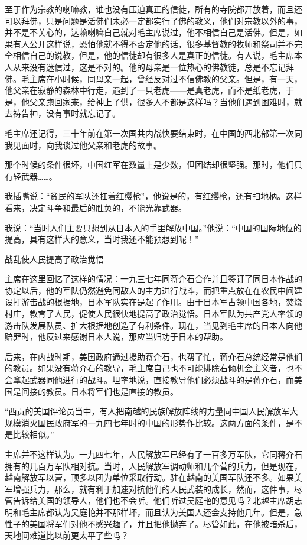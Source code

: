 至于作为宗教的喇嘛教，谁也没有压迫真正的信徒，所有的寺院都开放着，而且还可以拜佛，只是问题是活佛们未必一定都实行了佛的教义，他们对宗教以外的事，并不是不关心的，达赖喇嘛自己就对毛主席说过，他不相信自己是活佛。但是，如果有人公开这样说，恐怕他就不得不否定他的话，很多基督教的牧师和祭司并不完全相信自己的说教，但是，他的信徒却有很多人是真正的信徒。有人说，毛主席本人从来没有迷信过，这是不对的。他的母亲是一位热心的佛教徒，总是不忘记拜佛。毛主席在小时候，同母亲一起，曾经反对过不信佛教的父亲。但是，有一天，他父亲在寂静的森林中行走，遇到了一只老虎——是真老虎，而不是纸老虎，于是，他父亲跑回家来，给神上了供，很多人不都是这样吗？当他们遇到困难时，就去祷告神，没有事时就忘记了。

毛主席还记得，三十年前在第一次国共内战快要结束时，在中国的西北部第一次同我见面时，向我谈过他父亲和老虎的故事。

那个时候的条件很坏，中国红军在数量上是少数，但团结却很坚强。那时，他们只有轻武器……。

我插嘴说：“贫民的军队还扛着红缨枪”，他说是的，有红缨枪，还有扫地柄。这样看来，决定斗争和最后的胜负的，不能光靠武器。

我说：“当时人们主要只想到从日本人的手里解放中国。”他说：“中国的国际地位的提高，具有这样大的意义，当时我还不能预想到呢！”

战乱使人民提高了政治觉悟

主席在这里回忆了这样的情况：一九三七年同蒋介石合作并且签订了同日本作战的协定以后，他的军队仍然避免同敌人的主力进行战斗，而把重点放在在农民中间建设打游击战的根据地，日本军队实在是起了作用。由于日本军占领中国各地，焚烧村庄，教育了人民，促使人民很快地提高了政治觉悟。日本军队为共产党人率领的游击队发展队员、扩大根据地创造了有利条件。现在，当见到毛主席的日本人向他赔罪时，他反过来感谢日本人说，那应当归功于日本的帮助。

后来，在内战时期，美国政府通过援助蒋介石，也帮了忙，蒋介石总统经常是他们的教员。如果没有蒋介石的教导，毛主席自己也不可能排除右倾机会主义者，也不会拿起武器同他进行的战斗。坦率地说，直接教导他们必须战斗的是蒋介石，而美国是间接的教员。日本将军们也是直接的教员。

“西贡的美国评论员当中，有人把南越的民族解放阵线的力量同中国人民解放军大规模消灭国民政府军的一九四七年时的中国的形势作比较。这两方面的条件，是不是比较相似。”

主席并不这样认为。一九四七年，人民解放军已经有了一百多万军队，它同蒋介石拥有的几百万军队相对抗。当时，人民解放军调动师和几个营的兵力，但是现在，越南解放军以营，顶多以团为单位采取行动。驻在越南的美国军队还不多。如果美军增强兵力，那么，就有利于加速对抗他们的人民武装的成长，然而，这件事，尽管告诉给美国的领导人，他们也不会听。他们听过吴庭艳的意见吗？北越主席胡志明和毛主席都认为吴庭艳并不那样坏，而且认为美国人还会支持他几年。但是，急性子的美国将军们对他不感兴趣了，并且把他抛弃了。尽管如此，在他被暗杀后，天地间难道比以前更太平了些吗？


